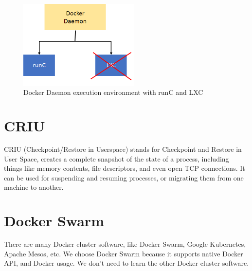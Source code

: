 \begin{figure}[h]
\begin{center}
\includegraphics[width=6cm]{figure/docker_LXC.png}
\end{center}
\caption{Docker Daemon execution environment with runC and LXC}
\label{fig:docker_LXC}
\end{figure}

\section{CRIU}
CRIU \cite{CRIU} (Checkpoint/Restore in Userspace) stands for Checkpoint and Restore in User Space, creates a complete snapshot of the state of a process, including things like memory contents, file descriptors, and even open TCP connections. It can be used for suspending and resuming processes, or migrating them from one machine to another.

\section{Docker Swarm}
There are many Docker cluster software, like Docker Swarm, Google Kubernetes, Apache Mesos, etc. We choose Docker Swarm because it supports native Docker API, and Docker usage. We don't need to learn the other Docker cluster software.

